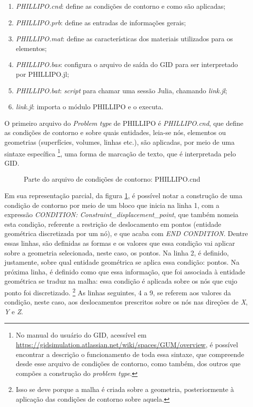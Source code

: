 \begin{enumerate}
    \item \emph{PHILLIPO.cnd}: define as condições de contorno e como são aplicadas;
    \item \emph{PHILLIPO.prb}: define as entradas de informações gerais;
    \item \emph{PHILLIPO.mat}: define as características dos materiais utilizados para os elementos;
    \item \emph{PHILLIPO.bas}: configura o arquivo de saída do GID para ser interpretado por PHILLIPO.jl;
    \item \emph{PHILLIPO.bat}: \emph{script} para chamar uma sessão Julia, chamando \emph{link.jl};
    \item \emph{link.jl}: importa o módulo PHILLIPO e o executa.
\end{enumerate}

O primeiro arquivo do \emph{Problem type} de PHILLIPO é \emph{PHILLIPO.cnd}, que define as condições de contorno e sobre quais entidades, leia-se nós, elementos ou geometrias (superfícies, volumes, linhas etc.), são aplicadas, por meio de uma sintaxe específica \footnote{No manual do usuário do GID, acessível em \url{https://gidsimulation.atlassian.net/wiki/spaces/GUM/overview}, é possível encontrar a descrição o funcionamento de toda essa sintaxe, que compreende desde esse arquivo de condições de contorno, como também, dos outros que compões a construção do \emph{problem type}.}, uma forma de marcação de texto, que é interpretada pelo GID.

\begin{figure}[hbtp]
    \caption{Parte do arquivo de condições de contorno: PHILLIPO.cnd}
    
    \label{fig:PHILLIPO.cnd}
\end{figure}

Em sua representação parcial, da figura \ref{fig:PHILLIPO.cnd}, é possível notar a construção de uma condição de contorno por meio de um bloco que inicia na linha 1, com a expressão \emph{CONDITION: Constraint\_displacement\_point}, que também nomeia esta condição, referente a restrição de deslocamento em pontos (entidade geométrica discretizada por um nó), e que acaba com \emph{END CONDITION}. Dentre essas linhas, são definidas as formas e os valores que essa condição vai aplicar sobre a geometria selecionada, neste caso, os pontos. Na linha 2, é definido, justamente, sobre qual entidade geométrica se aplica essa condição: pontos. Na próxima linha, é definido como que essa informação, que foi associada à entidade geométrica se traduz na malha: essa condição é aplicada sobre os nós que cujo ponto foi discretizado. \footnote{Isso se deve porque a malha é criada sobre a geometria, posteriormente à aplicação das condições de contorno sobre aquela.} As linhas seguintes, 4 a 9, se referem aos valores da condição, neste caso, aos deslocamentos prescritos sobre os nós nas direções de \emph{X}, \emph{Y} e \emph{Z}. 

